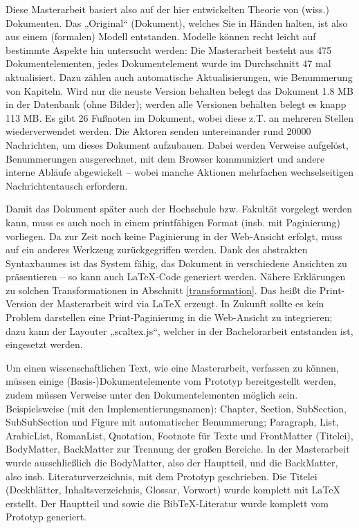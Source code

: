  
Diese Masterarbeit basiert also auf der hier entwickelten Theorie von (wiss.) Dokumenten. Das „Original“ (Dokument), welches Sie in Händen halten, ist also aus einem (formalen) Modell entstanden. Modelle können recht leicht auf bestimmte Aspekte hin untersucht werden: Die Masterarbeit besteht aus 475 Dokumentelementen, jedes Dokumentelement wurde im Durchschnitt 47 mal aktualisiert. Dazu zählen auch automatische Aktualisierungen, wie Benummerung von Kapiteln. Wird nur die neuste Version behalten belegt das Dokument 1.8 MB in der Datenbank (ohne Bilder); werden alle Versionen behalten belegt es knapp 113 MB. Es gibt 26 Fußnoten im Dokument, wobei diese z.T. an mehreren Stellen wiederverwendet werden. Die Aktoren senden untereinander rund 20000 Nachrichten, um dieses Dokument aufzubauen. Dabei werden Verweise aufgelöst, Benummerungen ausgerechnet, mit dem Browser kommuniziert und andere interne Abläufe abgewickelt -- wobei manche Aktionen mehrfachen wechselseitigen Nachrichtentausch erfordern.

 
Damit das Dokument später auch der Hochschule bzw. Fakultät vorgelegt werden kann, muss es auch noch in einem printfähigen Format (insb. mit Paginierung) vorliegen.  Da zur Zeit noch keine Paginierung in der Web-Ansicht erfolgt, muss auf ein anderes Werkzeug zurückgegriffen werden. Dank des abstrakten Syntaxbaumes ist das System fähig, das Dokument in verschiedene Ansichten zu präsentieren -- so kann auch LaTeX-Code generiert werden.  Nähere Erklärungen zu solchen Transformationen in Abschnitt \ref{transformation}. Das heißt die Print-Version der Masterarbeit wird via LaTeX erzeugt. In Zukunft sollte es kein Problem darstellen eine Print-Paginierung in die Web-Ansicht zu integrieren; dazu kann der Layouter „scaltex.js“, welcher in der Bachelorarbeit \citep{Hodapp} entstanden ist, eingesetzt werden.

 
Um einen wissenschaftlichen Text, wie eine Masterarbeit, verfassen zu können, müssen einige (Basis-)Dokumentelemente vom Prototyp bereitgestellt werden, zudem müssen Verweise unter den Dokumentelementen möglich sein. Beispielsweise (mit den Implementierungsnamen): Chapter, Section, SubSection, SubSubSection und Figure mit automatischer Benummerung; Paragraph, List, ArabicList, RomanList, Quotation, Footnote für Texte und FrontMatter (Titelei), BodyMatter, BackMatter zur Trennung der großen Bereiche. In der Masterarbeit wurde ausschließlich die BodyMatter, also der Hauptteil, und die BackMatter, also insb. Literaturverzeichnis, mit dem Prototyp geschrieben. Die Titelei (Deckblätter, Inhaltsverzeichnis, Glossar, Vorwort) wurde komplett mit LaTeX erstellt. Der Hauptteil und sowie die BibTeX-Literatur wurde komplett vom Prototyp generiert.

